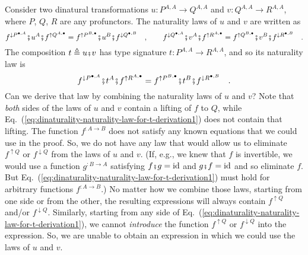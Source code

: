 Consider two dinatural transformations $u:P^{A,A}\rightarrow Q^{A,A}$
and $v:Q^{A,A}\rightarrow R^{A,A}$, where $P$, $Q$, $R$ are any
profunctors. The naturality laws of $u$ and $v$ are written as
\[
f^{\downarrow P^{\bullet,A}}\bef u^{A}\bef f^{\uparrow Q^{A,\bullet}}=f^{\uparrow P^{B,\bullet}}\bef u^{B}\bef f^{\downarrow Q^{\bullet,B}}\quad,\quad\quad f^{\downarrow Q^{\bullet,A}}\bef v^{A}\bef f^{\uparrow R^{A,\bullet}}=f^{\uparrow Q^{B,\bullet}}\bef v^{B}\bef f^{\downarrow R^{\bullet,B}}\quad.
\]
 The composition $t\triangleq u\bef v$ has type signature $t:P^{A,A}\rightarrow R^{A,A}$,
and so its naturality law is
\begin{equation}
f^{\downarrow P^{\bullet,A}}\bef t^{A}\bef f^{\uparrow R^{A,\bullet}}=f^{\uparrow P^{B,\bullet}}\bef t^{B}\bef f^{\downarrow R^{\bullet,B}}\quad.\label{eq:dinaturality-naturality-law-for-t-derivation1}
\end{equation}
Can we derive that law by combining the naturality laws of $u$ and
$v$? Note that \emph{both} sides of the laws of $u$ and $v$ contain
a lifting of $f$ to $Q$, while Eq.~(\ref{eq:dinaturality-naturality-law-for-t-derivation1})
does not contain that lifting. The function $f^{:A\rightarrow B}$
does not satisfy any known equations that we could use in the proof.
So, we do not have any law that would allow us to eliminate $f^{\uparrow Q}$
or $f^{\downarrow Q}$ from the laws of $u$ and $v$. (If, e.g.,
we knew that $f$ is invertible, we would use a function $g^{:B\rightarrow A}$
satisfying $f\bef g=\text{id}$ and $g\bef f=\text{id}$ and so eliminate
$f$. But Eq.~(\ref{eq:dinaturality-naturality-law-for-t-derivation1})
must hold for arbitrary functions $f^{:A\rightarrow B}$.) No matter
how we combine those laws, starting from one side or from the other,
the resulting expressions will always contain $f^{\uparrow Q}$ and/or
$f^{\downarrow Q}$. Similarly, starting from any side of Eq.~(\ref{eq:dinaturality-naturality-law-for-t-derivation1}),
we cannot \emph{introduce} the function $f^{\uparrow Q}$ or $f^{\downarrow Q}$
into the expression. So, we are unable to obtain an expression in
which we could use the laws of $u$ and $v$. 

